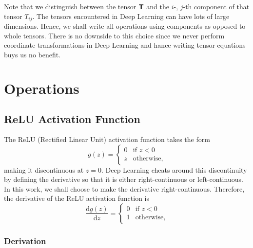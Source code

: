 \documentclass[modern]{aastex61}
\newcommand{\uderivative}{\mathrm{d}}
\begin{document}
Note that we distinguish between the tensor $\textbf{\textsf{T}}$ and the $i$-, $j$-th component of that tensor $T_{ij}$. The tensors encountered in Deep Learning can have lots of large dimensions. Hence, we shall write all operations using components as opposed to whole tensors. There is no downside to this choice since we never perform coordinate transformations in Deep Learning and hance writing tensor equations buys us no benefit.

\section{Operations} \label{sec:op}


\subsection{ReLU Activation Function} \label{sec:relu}

The ReLU (Rectified Linear Unit) activation function takes the form
\begin{equation} \label{eq:relu}
  g(z) =
  \begin{cases}
    0 & \text{if $z < 0$} \\
    z & \text{otherwise},
  \end{cases}
\end{equation}
making it discontinuous at $z = 0$. Deep Learning cheats around this discontinuity by defining the derivative so that it is either right-continuous or left-continuous. In this work, we shall choose to make the derivative right-continuous. Therefore, the derivative of the ReLU activation function is
\begin{equation} \label{eq:gradrelu}
  \frac{\uderivative g(z)}{\uderivative z} =
  \begin{cases}
    0 & \text{if $z < 0$} \\
    1 & \text{otherwise},
  \end{cases}
\end{equation}

\subsubsection{Derivation}
\end{document}
